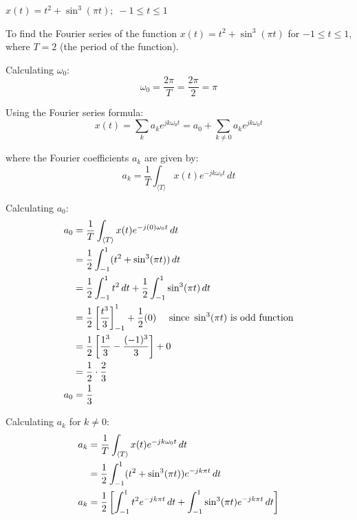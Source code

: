 \documentclass[a4paper, 10pt]{article}
\begin{document}
\begin{tosubmit}
\begin{subproblems}[start=3]
    \item \( x(t) = t^2 + \sin^3(\pi t);\; -1 \leq t \leq 1 \)
\end{subproblems}

\par\noindent\submitsolution
To find the Fourier series of the function \( x(t) = t^2 + \sin^3(\pi t) \) for \( -1 \leq t \leq 1 \), where \( T = 2 \) (the period of the function).

Calculating \( \omega_0 \):
\[ \omega_0 = \frac{2 \pi}{T} = \frac{2 \pi}{2} = \pi \]

Using the Fourier series formula:
\[ x(t) = \sum_{k} a_k e^{j k \omega_0 t} = a_0 + \sum_{k \neq 0} a_k e^{j k \omega_0 t} \]

where the Fourier coefficients \( a_k \) are given by:
\[ a_k = \frac{1}{T} \int_{\langle T \rangle} x(t) e^{-j k \omega_0 t} \,dt \]

Calculating \( a_0 \):
\begin{align*}
    a_0 &= \frac{1}{T} \int_{\langle T \rangle} x(t) e^{-j (0) \omega_0 t} \,dt \\
    &= \frac{1}{2} \int_{-1}^{1} (t^2 + \sin^3(\pi t)) \,dt \\
    &= \frac{1}{2} \int_{-1}^{1} t^2 \,dt + \frac{1}{2} \int_{-1}^{1} \sin^3(\pi t) \,dt \\
    &= \frac{1}{2} \left[ \frac{t^3}{3} \right]_{-1}^{1} + \frac{1}{2} (0) \quad \text{ since } \sin^3(\pi t) \text{ is odd function} \\
    &= \frac{1}{2} \left[ \frac{1^3}{3} - \frac{(-1)^3}{3} \right] + 0 \\
    &= \frac{1}{2} \cdot \frac{2}{3} \\
    a_0 &= \frac{1}{3}
\end{align*}

\newpage

Calculating \( a_k \) for \( k \neq 0 \):
\begin{align*}
    a_k &= \frac{1}{T} \int_{\langle T \rangle} x(t) e^{-j k \omega_0 t} \,dt \\
    &= \frac{1}{2} \int_{-1}^{1} (t^2 + \sin^3(\pi t)) e^{-j k \pi t} \,dt \\
    a_k &= \frac{1}{2} \left[ \int_{-1}^{1} t^2 e^{-j k \pi t} \,dt + \int_{-1}^{1} \sin^3(\pi t) e^{-j k \pi t} \,dt \right]
\end{align*}


\end{tosubmit}
\end{document}
